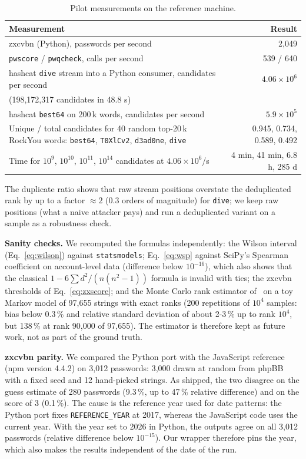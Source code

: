 \documentclass[conference]{IEEEtran}
\begin{document}
\begin{table}[t]
\centering
\caption{Pilot measurements on the reference machine.}
\label{tab:pilot}
\footnotesize
\renewcommand{\arraystretch}{1.12}
\begin{tabularx}{\columnwidth}{@{}Y r@{}}
\toprule
\textbf{Measurement} & \textbf{Result}\\
\midrule
zxcvbn (Python), passwords per second & 2{,}049\\
\texttt{pwscore} / \texttt{pwqcheck}, calls per second & 539 / 640\\
hashcat \texttt{dive} stream into a Python consumer, candidates per second & $4.06{\times}10^{6}$\\
\quad (198{,}172{,}317 candidates in 48.8 s) & \\
hashcat \texttt{best64} on 200\,k words, candidates per second & $5.9{\times}10^{5}$\\
Unique / total candidates for 40 random top-20\,k RockYou words: \texttt{best64}, \texttt{T0XlCv2}, \texttt{d3ad0ne}, \texttt{dive} & 0.945, 0.734, 0.589, 0.492\\
Time for $10^{9}$, $10^{10}$, $10^{11}$, $10^{14}$ candidates at $4.06{\times}10^{6}$/s & 4 min, 41 min, 6.8 h, 285 d\\
\bottomrule
\end{tabularx}
\end{table}

The duplicate ratio shows that raw stream positions overstate the deduplicated rank by up to a factor $\approx2$ (0.3 orders of magnitude) for \texttt{dive}; we keep raw positions (what a naive attacker pays) and run a deduplicated variant on a sample as a robustness check.

\textbf{Sanity checks.} We recomputed the formulas independently: the Wilson interval (Eq.~\ref{eq:wilson}) against \texttt{statsmodels}; Eq.~\eqref{eq:wsp} against SciPy's Spearman coefficient on account-level data (difference below $10^{-16}$), which also shows that the classical $1-6\sum d^2/(n(n^2-1))$ formula is invalid with ties; the zxcvbn thresholds of Eq.~\eqref{eq:zxscore}; and the Monte Carlo rank estimator of~\cite{dellamico2015} on a toy Markov model of 97{,}655 strings with exact ranks (200 repetitions of $10^4$ samples: bias below 0.3\,\% and relative standard deviation of about 2-3\,\% up to rank $10^4$, but 138\,\% at rank 90{,}000 of 97{,}655). The estimator is therefore kept as future work, not as part of the ground truth.

\textbf{zxcvbn parity.} We compared the Python port with the JavaScript reference (npm version 4.4.2) on 3{,}012 passwords: 3{,}000 drawn at random from phpBB with a fixed seed and 12 hand-picked strings. As shipped, the two disagree on the guess estimate of 280 passwords (9.3\,\%, up to 47\,\% relative difference) and on the score of 3 (0.1\,\%). The cause is the reference year used for date patterns: the Python port fixes \texttt{REFERENCE\_YEAR} at 2017, whereas the JavaScript code uses the current year. With the year set to 2026 in Python, the outputs agree on all 3{,}012 passwords (relative difference below $10^{-15}$). Our wrapper therefore pins the year, which also makes the results independent of the date of the run.
\end{document}

